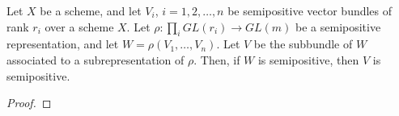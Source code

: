 \begin{lemma}
Let $X$ be a scheme, and let $V_i$, $i=1,2,\ldots,n$ be semipositive vector bundles of rank $r_i$ over a scheme $X$. Let $\rho:\prod_i GL(r_i)\to GL(m)$ be a semipositive representation, and let $W=\rho(V_1,\ldots,V_n)$. Let $V$ be the subbundle of $W$ associated to a subrepresentation of $\rho$. Then, if $W$ is semipositive, then $V$ is semipositive.
\end{lemma}

\begin{proof}

\end{proof}







